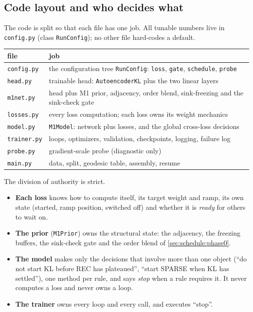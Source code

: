\subsection{Code layout and who decides what}
\label{sec:schedule:layout}
The code is split so that each file has one job. All tunable numbers live in
\texttt{config.py} (class \texttt{RunConfig}); no other file hard-codes a default.
\begin{center}
\begin{tabular}{@{}ll@{}}
\toprule
file & job\\
\midrule
\texttt{config.py} & the configuration tree \texttt{RunConfig}: \texttt{loss},
\texttt{gate}, \texttt{schedule}, \texttt{probe}\\
\texttt{head.py} & trainable head: \texttt{AutoencoderKL} plus the two linear
layers\\
\texttt{m1net.py} & head plus M1 prior, adjacency, order blend, sink-freezing and the
sink-check gate\\
\texttt{losses.py} & every loss computation; each loss owns its weight mechanics\\
\texttt{model.py} & \texttt{M1Model}: network plus losses, and the global cross-loss
decisions\\
\texttt{trainer.py} & loops, optimizers, validation, checkpoints, logging, failure
log\\
\texttt{probe.py} & gradient-scale probe (diagnostic only)\\
\texttt{main.py} & data, split, geodesic table, assembly, resume\\
\bottomrule
\end{tabular}
\end{center}
The division of authority is strict.
\begin{itemize}[leftmargin=1.5em]
\item \textbf{Each loss} knows how to compute itself, its target weight and ramp, its
      own state (started, ramp position, switched off) and whether it is
      \emph{ready} for others to wait on.
\item \textbf{The prior} (\texttt{M1Prior}) owns the structural state: the adjacency,
      the freezing buffers, the sink-check gate and the order blend of
      \cref{sec:schedule:phase0}.
\item \textbf{The model} makes only the decisions that involve more than one object
      (``do not start KL before REC has plateaued'', ``start SPARSE when KL has
      settled''), one method per rule, and says \emph{stop} when a rule requires it.
      It never computes a loss and never owns a loop.
\item \textbf{The trainer} owns every loop and every call, and executes ``stop''.
\end{itemize}

